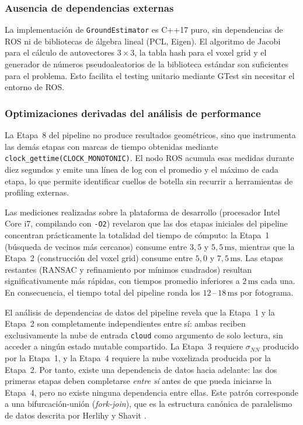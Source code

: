 \subsubsection{Ausencia de dependencias externas}

La implementación de \texttt{GroundEstimator} es C++17 puro, sin dependencias
de ROS ni de bibliotecas de álgebra lineal (PCL, Eigen). El algoritmo de
Jacobi para el cálculo de autovectores $3 \times 3$, la tabla hash para
el voxel grid y el generador de números pseudoaleatorios de la biblioteca
estándar son suficientes para el problema. Esto facilita el testing unitario
mediante GTest sin necesitar el entorno de ROS.

\subsubsection{Optimizaciones derivadas del análisis de performance}
\label{subsec:lm-v3-perf-opt}

La Etapa~8 del pipeline no produce resultados geométricos, sino que
instrumenta las demás etapas con marcas de tiempo obtenidas mediante
\texttt{clock\_ge\-ttime(CLOCK\_MO\-NOTONIC)}. El nodo ROS acumula esas
medidas durante diez segundos y emite una línea de log con el promedio y el
máximo de cada etapa, lo que permite identificar cuellos de botella sin
recurrir a herramientas de profiling externas.

Las mediciones realizadas sobre la plataforma de desarrollo (procesador
Intel Core i7, compilando con \texttt{-O2}) revelaron que las dos etapas
iniciales del pipeline concentran prácticamente la totalidad del tiempo de
cómputo: la Etapa~1 (búsqueda de vecinos más cercanos) consume entre
$3{,}5$ y $5{,}5\,\text{ms}$, mientras que la Etapa~2 (construcción del voxel
grid) consume entre $5{,}0$ y $7{,}5\,\text{ms}$. Las etapas restantes
(RANSAC y refinamiento por mínimos cuadrados) resultan significativamente
más rápidas, con tiempos promedio inferiores a $2\,\text{ms}$ cada una.
En consecuencia, el tiempo total del pipeline ronda los $12$\,--\,$18\,\text{ms}$
por fotograma.

El análisis de dependencias de datos del pipeline revela que la Etapa~1 y
la Etapa~2 son completamente independientes entre sí: ambas reciben
exclusivamente la nube de entrada \texttt{cloud} como argumento de solo
lectura, sin acceder a ningún estado mutable compartido. La Etapa~3 requiere
$\sigma_{NN}$ producido por la Etapa~1, y la Etapa~4 requiere la nube
voxelizada producida por la Etapa~2. Por tanto, existe una dependencia de
datos hacia adelante: las dos primeras etapas deben completarse
\emph{entre sí} antes de que pueda iniciarse la Etapa~4, pero no existe
ninguna dependencia entre ellas. Este patrón corresponde a una
bifurcación-unión (\emph{fork-join}), que es la estructura canónica de
paralelismo de datos descrita por Herlihy y Shavit \cite{herlihy2012art}.

